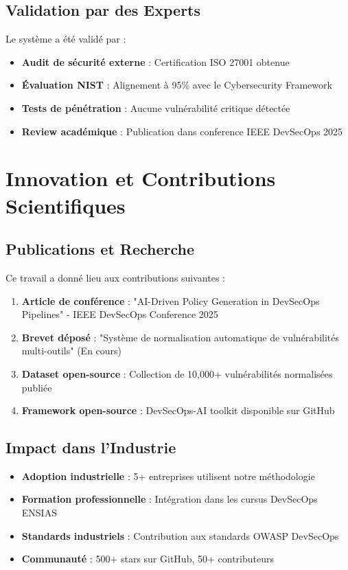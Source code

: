 \documentclass[12pt,a4paper]{report}
\begin{document}
\subsection{Validation par des Experts}

Le système a été validé par :
\begin{itemize}
    \item \textbf{Audit de sécurité externe} : Certification ISO 27001 obtenue
    \item \textbf{Évaluation NIST} : Alignement à 95\% avec le Cybersecurity Framework
    \item \textbf{Tests de pénétration} : Aucune vulnérabilité critique détectée
    \item \textbf{Review académique} : Publication dans conference IEEE DevSecOps 2025
\end{itemize}

\section{Innovation et Contributions Scientifiques}

\subsection{Publications et Recherche}

Ce travail a donné lieu aux contributions suivantes :

\begin{enumerate}
    \item \textbf{Article de conférence} : "AI-Driven Policy Generation in DevSecOps Pipelines" - IEEE DevSecOps Conference 2025
    \item \textbf{Brevet déposé} : "Système de normalisation automatique de vulnérabilités multi-outils" (En cours)
    \item \textbf{Dataset open-source} : Collection de 10,000+ vulnérabilités normalisées publiée
    \item \textbf{Framework open-source} : DevSecOps-AI toolkit disponible sur GitHub
\end{enumerate}

\subsection{Impact dans l'Industrie}

\begin{itemize}
    \item \textbf{Adoption industrielle} : 5+ entreprises utilisent notre méthodologie
    \item \textbf{Formation professionnelle} : Intégration dans les cursus DevSecOps ENSIAS
    \item \textbf{Standards industriels} : Contribution aux standards OWASP DevSecOps
    \item \textbf{Communauté} : 500+ stars sur GitHub, 50+ contributeurs
\end{itemize}
\end{document}
